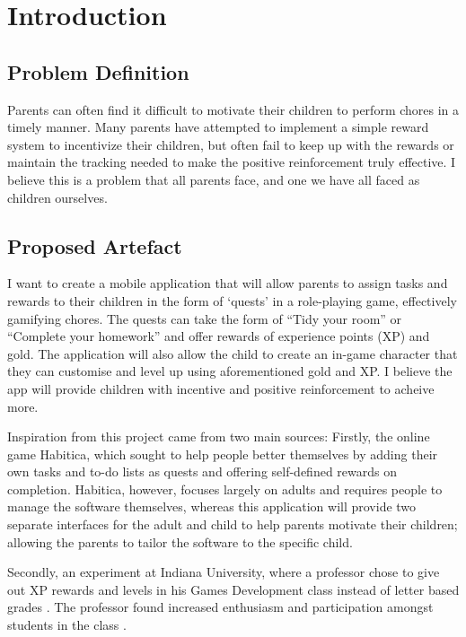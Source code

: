 \chapter{Introduction}
\label{chap:intro}

\section{Problem Definition}
Parents can often find it difficult to motivate their children to perform chores in a timely manner. 
Many parents have attempted to implement a simple reward system to incentivize their children, but often fail to keep up with the rewards or maintain the tracking needed to make the positive reinforcement truly effective.
I believe this is a problem that all parents face, and one we have all faced as children ourselves.  

\section{Proposed Artefact}
I want to create a mobile application that will allow parents to assign tasks and rewards to their children in the form of `quests' in a role-playing game, effectively gamifying chores. 
The quests can take the form of ``Tidy your room'' or ``Complete your homework'' and offer rewards of experience points (XP) and gold. The application will also allow the child to create an in-game character that they can customise and level up using aforementioned gold and XP.
I believe the app will provide children with incentive and positive reinforcement to acheive more.


Inspiration from this project came from two main sources: Firstly, the online game Habitica, which sought to help people better themselves by adding their own tasks and to-do lists as quests and offering self-defined rewards on completion. 
Habitica, however, focuses largely on adults and requires people to manage the software themselves, whereas this application will provide two separate interfaces for the adult and child to help parents motivate their children; allowing the parents to tailor the software to the specific child.

Secondly, an experiment at Indiana University, where a professor chose to give out XP rewards and levels in his Games Development class instead of letter based grades \cite{sheldon2011multiplayer}.  
The professor found increased enthusiasm and participation amongst students in the class \cite{sheldonclasspostmortem}.

